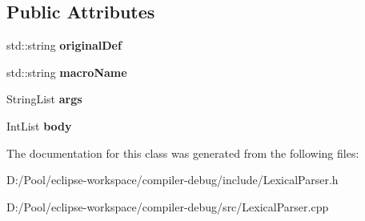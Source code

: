 \subsection*{Public Attributes}
\begin{DoxyCompactItemize}
\item 
\mbox{\label{classx2_1_1_define_preprocessor_a970d2efccc81da7bb3c4c6e353d920cf}} 
std\+::string {\bfseries original\+Def}
\item 
\mbox{\label{classx2_1_1_define_preprocessor_a6901a2c563b40b5e1a008321a2639c7c}} 
std\+::string {\bfseries macro\+Name}
\item 
\mbox{\label{classx2_1_1_define_preprocessor_a8d6aa202f11500f41ad3cadd61f2457d}} 
String\+List {\bfseries args}
\item 
\mbox{\label{classx2_1_1_define_preprocessor_ae4286517adcef6969cafac1bbacbf755}} 
Int\+List {\bfseries body}
\end{DoxyCompactItemize}


The documentation for this class was generated from the following files\+:\begin{DoxyCompactItemize}
\item 
D\+:/\+Pool/eclipse-\/workspace/compiler-\/debug/include/Lexical\+Parser.\+h\item 
D\+:/\+Pool/eclipse-\/workspace/compiler-\/debug/src/Lexical\+Parser.\+cpp\end{DoxyCompactItemize}
